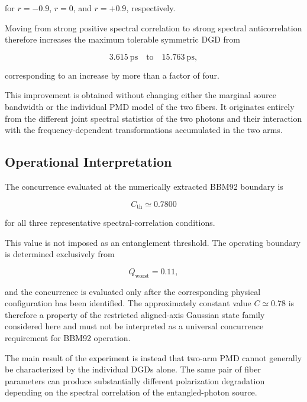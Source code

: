 for \(r=-0.9\), \(r=0\), and \(r=+0.9\), respectively.

Moving from strong positive spectral correlation to strong spectral
anticorrelation therefore increases the maximum tolerable symmetric DGD from

\begin{equation}
3.615~\mathrm{ps}
\quad\text{to}\quad
15.763~\mathrm{ps},
\end{equation}

corresponding to an increase by more than a factor of four.

This improvement is obtained without changing either the marginal source
bandwidth or the individual PMD model of the two fibers. It originates entirely
from the different joint spectral statistics of the two photons and their
interaction with the frequency-dependent transformations accumulated in the two
arms.



\subsection{Operational Interpretation}

The concurrence evaluated at the numerically extracted BBM92 boundary is

\begin{equation}
C_{\mathrm{th}}
\simeq
0.7800
\end{equation}

for all three representative spectral-correlation conditions.

This value is not imposed as an entanglement threshold. The operating boundary
is determined exclusively from

\begin{equation}
Q_{\mathrm{worst}}
=
0.11,
\end{equation}

and the concurrence is evaluated only after the corresponding physical
configuration has been identified. The approximately constant value
\(C\simeq0.78\) is therefore a property of the restricted aligned-axis Gaussian
state family considered here and must not be interpreted as a universal
concurrence requirement for BBM92 operation.

The main result of the experiment is instead that two-arm PMD cannot generally
be characterized by the individual DGDs alone. The same pair of fiber
parameters can produce substantially different polarization degradation
depending on the spectral correlation of the entangled-photon source.

